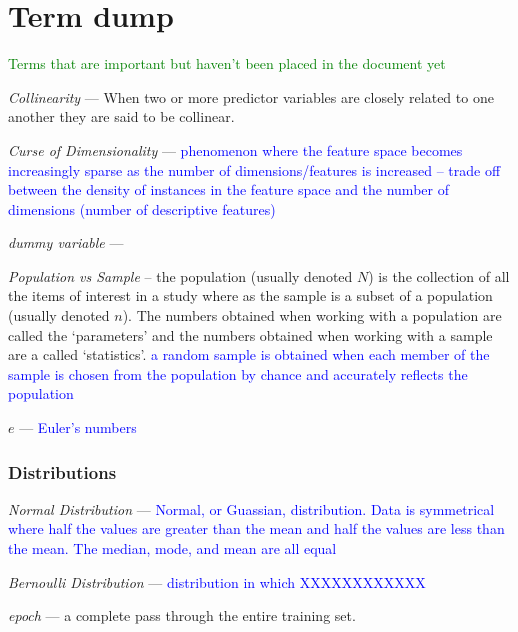\chapter{Term dump}

\textcolor{green}{Terms that are important but haven't been placed in the document yet}

\emph{Collinearity} --- When two or more predictor variables are closely related to one another they are said to be collinear.

\emph{Curse of Dimensionality} --- \textcolor{blue}{phenomenon where the feature space becomes increasingly sparse as the number of dimensions/features is increased -- trade off between the density of instances in the feature space and the number of dimensions (number of descriptive features)}

\emph{dummy variable} ---


\emph{Population vs Sample} -- the population (usually denoted $N$) is the collection of all the items of interest in a study where as the sample is a subset of a population (usually denoted $n$). The numbers obtained when working with a population are called the `parameters' and the numbers obtained when working with a sample are a called `statistics'. \textcolor{blue}{a random sample is obtained when each member of the sample is chosen from the population by chance and accurately reflects the population}

\emph{$e$} --- \textcolor{blue}{Euler's numbers}

\subsection{Distributions}

\emph{Normal Distribution} --- \textcolor{blue}{Normal, or Guassian, distribution. Data is symmetrical where half the values are greater than the mean and half the values are less than the mean. The median, mode, and mean are all equal}

\emph{Bernoulli Distribution} --- \textcolor{blue}{distribution in which XXXXXXXXXXXX}

\emph{epoch} --- a complete pass through the entire training set.
